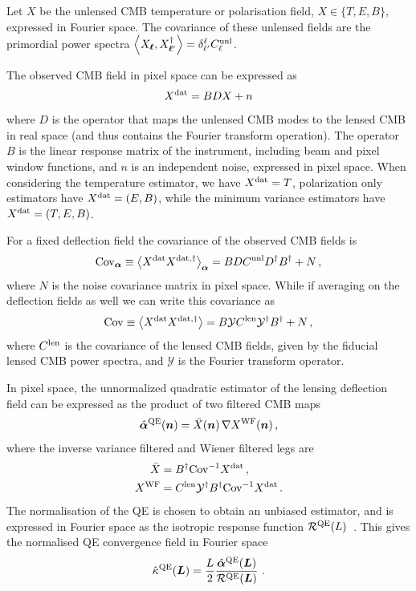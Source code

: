 \documentclass[prd, superscriptaddress, tightenlines, longbibliography, nofootinbib, eqsecnum, amsfonts, amsmath, floatfix, twocolumn, notitlepage]{revtex4-2}
\newcommand{\Cov}[0]{ {\rm{Cov}} }
\begin{document}
Let $X$ be the unlensed CMB temperature or polarisation field, $X \in \{T, E, B\}$, expressed in Fourier space.
The covariance of these unlensed fields are the primordial power spectra 
$\left<X_{{\boldsymbol{\ell}}}, X_{{\boldsymbol{\ell}}'}^\dagger \right> = \delta^{\ell}_{\ell'} C_\ell^{\rm unl}$.

The observed CMB field in pixel space can be expressed as 
\begin{equation}
    X^{\rm dat} = BDX + n
\end{equation}
where $D$ is the operator that maps the unlensed CMB modes to the lensed CMB in real space (and thus contains the Fourier transform operation). The operator $B$ is the linear response matrix of the instrument, including beam and pixel window functions, and $n$ is an independent noise, expressed in pixel space.
When considering the temperature estimator, we have $ X^{\rm dat} = T$, polarization only estimators have $ X^{\rm dat} = (E, B)$, while the minimum variance estimators have  $X^{\rm dat} = (T, E, B)$.

For a fixed deflection field the covariance of the observed CMB fields is
\begin{equation}
    \Cov_{\valpha} \equiv \left<X^{\rm dat} X^{\rm dat, \dagger} \right>_{\valpha}  = BDC^{\rm unl} D^\dagger B^\dagger + N \, ,
\end{equation}
where $N$ is the noise covariance matrix in pixel space. 
While if averaging on the deflection fields as well we can write this covariance as 
\begin{equation}
    \Cov \equiv \left<X^{\rm dat} X^{\rm dat, \dagger} \right> = B \mathcal{Y} C^{\rm len} \mathcal{Y}^\dagger B^\dagger + N \, ,
\end{equation}
where $C^{\rm len}$ is the covariance of the lensed CMB fields, given by the fiducial lensed CMB power spectra, and $\mathcal{Y}$ is the Fourier transform operator.

In pixel space, the unnormalized quadratic estimator of the lensing deflection field can be expressed as the product of two filtered CMB maps
\begin{equation}\label{Eq:QE}
    \hat {{\boldsymbol{\alpha}}}^{\rm QE}({\mbox{\boldmath{$n$}}}) = \bar X({\mbox{\boldmath{$n$}}}) \, \nabla X^{\rm WF}({\mbox{\boldmath{$n$}}}) \, ,
\end{equation}
where the inverse variance filtered and Wiener filtered legs are
\begin{equation}
    \begin{split}
        \bar X &= B^{\dagger} \Cov^{-1} X^{\rm dat} \, , \\
        X^{\rm WF} &= C^{\rm len}  \mathcal{Y}^\dagger B^{\dagger} \Cov^{-1} X^{\rm dat} \, .
    \end{split}
\end{equation}
The normalisation of the QE is chosen to obtain an unbiased estimator, and is expressed in Fourier space as the isotropic response function $\mathcal R^{\rm QE}(L)$~\cite{Hu:2001kj}.
This gives the normalised QE convergence field in Fourier space
\begin{equation}
    \hat \kappa^{\rm QE}({\mbox{\boldmath{$L$}}}) = \frac{L}{2} \frac{\hat {{\boldsymbol{\alpha}}}^{\rm QE}({\mbox{\boldmath{$L$}}})}{\mathcal R^{\rm QE}({\mbox{\boldmath{$L$}}})} \,  \, .
\end{equation}
\end{document}
